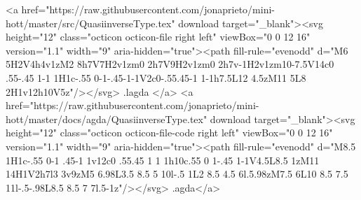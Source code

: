         <a href="https://raw.githubusercontent.com/jonaprieto/mini-hott/master/src/QuasiinverseType.tex" download target="_blank"><svg height="12" class="octicon octicon-file right left" viewBox="0 0 12 16" version="1.1" width="9" aria-hidden="true"><path fill-rule="evenodd" d="M6 5H2V4h4v1zM2 8h7V7H2v1zm0 2h7V9H2v1zm0 2h7v-1H2v1zm10-7.5V14c0 .55-.45 1-1 1H1c-.55 0-1-.45-1-1V2c0-.55.45-1 1-1h7.5L12 4.5zM11 5L8 2H1v12h10V5z"/></svg> .lagda </a>
        <a href="https://raw.githubusercontent.com/jonaprieto/mini-hott/master/docs/agda/QuasiinverseType.tex" download target="_blank"><svg height="12" class="octicon octicon-file-code right left" viewBox="0 0 12 16" version="1.1" width="9" aria-hidden="true"><path fill-rule="evenodd" d="M8.5 1H1c-.55 0-1 .45-1 1v12c0 .55.45 1 1 1h10c.55 0 1-.45 1-1V4.5L8.5 1zM11 14H1V2h7l3 3v9zM5 6.98L3.5 8.5 5 10l-.5 1L2 8.5 4.5 6l.5.98zM7.5 6L10 8.5 7.5 11l-.5-.98L8.5 8.5 7 7l.5-1z"/></svg> .agda</a>
      
